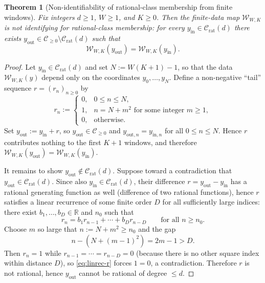 \documentclass[11pt,reqno]{amsart}
\newtheorem{theorem}{Theorem}[section]
\theoremstyle{definition}
\theoremstyle{remark}
\newcommand{\R}{\mathbb{R}}
\newcommand{\1}{\mathbf{1}}
\begin{document}
\begin{theorem}[Non-identifiability of rational-class membership from finite windows]\label{thm:window-nonident-rational-membership}
Fix integers $d\ge 1$, $W\ge 1$, and $K\ge 0$.
Then the finite-data map $\mathcal W_{W,K}$ is not identifying for rational-class membership:
for every $y_{\mathrm{in}}\in\mathcal C_{\mathrm{rat}}(d)$ there exists
$y_{\mathrm{out}}\in\mathcal C_{\ge 0}\setminus\mathcal C_{\mathrm{rat}}(d)$ such that
\[
\mathcal W_{W,K}(y_{\mathrm{out}})=\mathcal W_{W,K}(y_{\mathrm{in}}).
\]
\end{theorem}

\begin{proof}
Let $y_{\mathrm{in}}\in\mathcal C_{\mathrm{rat}}(d)$ and set $N:=W(K+1)-1$, so that the data
$\mathcal W_{W,K}(y)$ depend only on the coordinates $y_0,\dots,y_N$.
Define a non-negative ``tail'' sequence $r=(r_n)_{n\ge 0}$ by
\[
r_n:=\begin{cases}
0, & 0\le n\le N,\\
1, & n=N+m^2 \text{ for some integer } m\ge 1,\\
0, & \text{otherwise}.
\end{cases}
\]
Set $y_{\mathrm{out}}:=y_{\mathrm{in}}+r$, so $y_{\mathrm{out}}\in\mathcal C_{\ge 0}$ and
$y_{\mathrm{out},n}=y_{\mathrm{in},n}$ for all $0\le n\le N$.
Hence $r$ contributes nothing to the first $K+1$ windows, and therefore
$\mathcal W_{W,K}(y_{\mathrm{out}})=\mathcal W_{W,K}(y_{\mathrm{in}})$.

It remains to show $y_{\mathrm{out}}\notin \mathcal C_{\mathrm{rat}}(d)$.
Suppose toward a contradiction that $y_{\mathrm{out}}\in \mathcal C_{\mathrm{rat}}(d)$.
Since also $y_{\mathrm{in}}\in \mathcal C_{\mathrm{rat}}(d)$, their difference
$r=y_{\mathrm{out}}-y_{\mathrm{in}}$ has a rational generating function as well (difference of two rational functions),
hence $r$ satisfies a linear recurrence of some finite order $D$ for all sufficiently large indices:
there exist $b_1,\dots,b_D\in\R$ and $n_0$ such that
\begin{equation}\label{eq:linrec-r}
r_n=b_1 r_{n-1}+\cdots+b_D r_{n-D}\qquad\text{for all }n\ge n_0.
\end{equation}
Choose $m$ so large that $n:=N+m^2\ge n_0$ and the gap
\[
n-(N+(m-1)^2)=2m-1>D.
\]
Then $r_n=1$ while $r_{n-1}=\cdots=r_{n-D}=0$ (because there is no other square index within distance $D$),
so \eqref{eq:linrec-r} forces $1=0$, a contradiction. Therefore $r$ is not rational, hence
$y_{\mathrm{out}}$ cannot be rational of degree $\le d$.


\end{proof}
\end{document}
